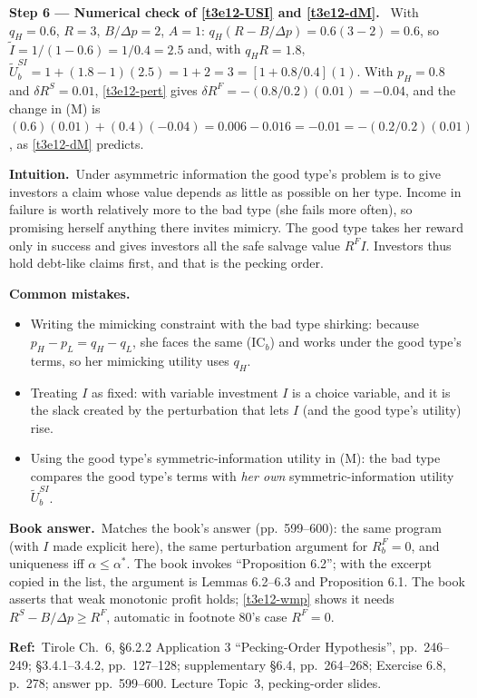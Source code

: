 \documentclass[11pt,a4paper]{article}
\newcommand{\step}[2]{\par\medskip\noindent\textbf{Step #1 --- #2.}~}
\newcommand{\intuition}{\par\medskip\noindent\textbf{Intuition.}~}
\newcommand{\bookans}{\par\medskip\noindent\textbf{Book answer.}~}
\newcommand{\refbib}{\par\smallskip\noindent\textbf{Ref:}~}
\newcommand{\pitfalls}{\par\medskip\noindent\textbf{Common mistakes.}}
\begin{document}
\step{6}{Numerical check of \eqref{t3e12-USI} and \eqref{t3e12-dM}} With $q_H=0.6$, $R=3$,
$B/\Delta p=2$, $A=1$: $q_H(R-B/\Delta p)=0.6(3-2)=0.6$, so $\tilde I=1/(1-0.6)=1/0.4=2.5$ and, with $q_HR=1.8$,
$\tilde U_b^{SI}=1+(1.8-1)(2.5)=1+2=3=[1+0.8/0.4](1)$. With $p_H=0.8$ and $\delta R^S=0.01$, \eqref{t3e12-pert} gives
$\delta R^F=-(0.8/0.2)(0.01)=-0.04$, and the change in (M) is $(0.6)(0.01)+(0.4)(-0.04)=0.006-0.016=-0.01=-(0.2/0.2)(0.01)$, as \eqref{t3e12-dM} predicts.

\intuition Under asymmetric information the good type's problem is to give investors a claim whose value
depends as little as possible on her type. Income in failure is worth relatively more to the bad type (she
fails more often), so promising herself anything there invites mimicry. The good type takes her reward
only in success and gives investors all the safe salvage value $R^FI$. Investors thus hold debt-like
claims first, and that is the pecking order.

\pitfalls
\begin{itemize}
  \item Writing the mimicking constraint with the bad type shirking: because $p_H-p_L=q_H-q_L$, she faces the same (IC$_b$) and works under the good type's terms, so her mimicking utility uses $q_H$.
  \item Treating $I$ as fixed: with variable investment $I$ is a choice variable, and it is the slack created by the perturbation that lets $I$ (and the good type's utility) rise.
  \item Using the good type's symmetric-information utility in (M): the bad type compares the good type's terms with \emph{her own} symmetric-information utility $\tilde U_b^{SI}$.
\end{itemize}

\bookans Matches the book's answer (pp.~599--600): the same program (with $I$ made explicit here), the
same perturbation argument for $R_b^F=0$, and uniqueness iff $\alpha\le\alpha^*$. The book invokes
``Proposition 6.2''; with the excerpt copied in the list, the argument is Lemmas 6.2--6.3 and Proposition
6.1. The book asserts that weak monotonic profit holds; \eqref{t3e12-wmp} shows it needs
$R^S-B/\Delta p\ge R^F$, automatic in footnote 80's case $R^F=0$.

\refbib{Tirole Ch.~6, \S6.2.2 Application 3 ``Pecking-Order Hypothesis'', pp.~246--249; \S3.4.1--3.4.2,
pp.~127--128; supplementary \S6.4, pp.~264--268; Exercise 6.8, p.~278; answer pp.~599--600. Lecture
Topic~3, pecking-order slides.}
\end{document}
